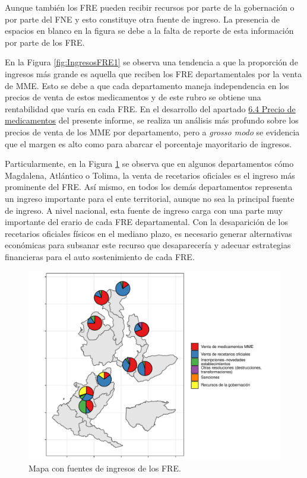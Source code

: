 \documentclass[
  oneside]{book}
\begin{document}
Aunque también los FRE pueden recibir recursos por parte de la gobernación o por parte del FNE y esto constituye otra fuente de ingreso. La presencia de espacios en blanco en la figura se debe a la falta de reporte de esta información por parte de los FRE.

En la Figura \ref{fig:IngresosFRE1} se observa una tendencia a que la proporción de ingresos más grande es aquella que reciben los FRE departamentales por la venta de MME. Esto se debe a que cada departamento maneja independencia en los precios de venta de estos medicamentos y de este rubro se obtiene una rentabilidad que varía en cada FRE. En el desarrollo del apartado \protect\hyperlink{precioMedicamentos}{6.4 Precio de medicamentos} del presente informe, se realiza un análisis más profundo sobre los precios de venta de los MME por departamento, pero a \emph{grosso modo} se evidencia que el margen es alto como para abarcar el porcentaje mayoritario de ingresos.

Particularmente, en la Figura \ref{fig:IngresosFRE2} se observa que en algunos departamentos cómo Magdalena, Atlántico o Tolima, la venta de recetarios oficiales es el ingreso más prominente del FRE. Así mismo, en todos los demás departamentos representa un ingreso importante para el ente territorial, aunque no sea la principal fuente de ingreso. A nivel nacional, esta fuente de ingreso carga con una parte muy importante del erario de cada FRE departamental. Con la desaparición de los recetarios oficiales físicos en el mediano plazo, es necesario generar alternativas económicas para subsanar este recurso que desaparecería y adecuar estrategias financieras para el auto sostenimiento de cada FRE.

\begin{figure}[th!]

{\centering \includegraphics[width=0.85\linewidth]{InformeFinal_files/figure-latex/IngresosFRE2-1} 

}

\caption{Mapa con fuentes de ingresos de los FRE.}\label{fig:IngresosFRE2}
\end{figure}
\end{document}
